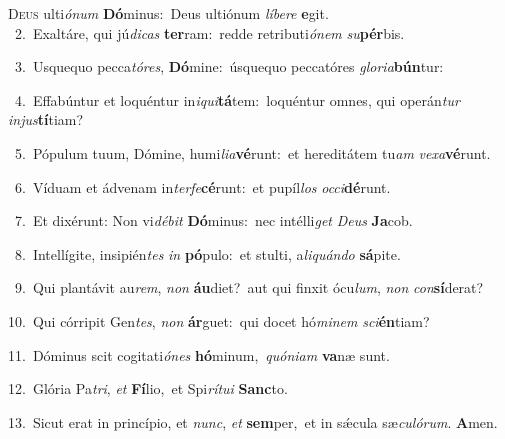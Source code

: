 \lettrine{\initial\textcolor{\initialcolor}{D}}{eus} ulti\-\textit{ó}\-\textit{num} \textbf{Dó}\-minus:~\star Deus ultiónum \textit{lí}\-\textit{be}\textit{re} \textbf{e}\-git.\\
{\numbfont\textcolor{\numbcolor}{~2.}}~Exaltáre, qui jú\-\textit{di}\-\textit{cas} \textbf{ter}\-ram:~\star redde retributi\-\textit{ó}\-\textit{nem} \textit{su}\-\textbf{pér}bis.\par
{\numbfont\textcolor{\numbcolor}{~3.}}~Usquequo pecca\-\textit{tó}\-\textit{res}, \textbf{Dó}\-mine:~\star úsquequo peccatóres \textit{glo}\-\textit{ri}\textit{a}\textbf{bún}tur:\par
{\numbfont\textcolor{\numbcolor}{~4.}}~Effabúntur et loquéntur in\-\textit{i}\-\textit{qui}\textbf{tá}tem:~\star loquéntur omnes, qui operán\textit{tur} \textit{in}\-\textit{jus}\textbf{tí}tiam?\par
{\numbfont\textcolor{\numbcolor}{~5.}}~Pópulum tuum, Dómine, humi\-\textit{li}\-\textit{a}\textbf{vé}runt:~\star et hereditátem tu\textit{am} \textit{ve}\-\textit{xa}\textbf{vé}runt.\par
{\numbfont\textcolor{\numbcolor}{~6.}}~Víduam et ádvenam in\-\textit{ter}\-\textit{fe}\textbf{cé}runt:~\star et pupíl\textit{los} \textit{oc}\-\textit{ci}\textbf{dé}runt.\par
{\numbfont\textcolor{\numbcolor}{~7.}}~Et dixérunt: Non vi\-\textit{dé}\-\textit{bit} \textbf{Dó}\-minus:~\star nec intélli\textit{get} \textit{De}\-\textit{us} \textbf{Ja}\-cob.\par
{\numbfont\textcolor{\numbcolor}{~8.}}~Intellígite, insipién\textit{tes} \textit{in} \textbf{pó}\-pulo:~\star et stulti, a\-\textit{li}\-\textit{quán}\textit{do} \textbf{sá}\-pite.\par
{\numbfont\textcolor{\numbcolor}{~9.}}~Qui plantávit au\-\textit{rem}\-, \textit{non} \textbf{áu}\-diet?~\star aut qui finxit ócu\-\textit{lum}\-, \textit{non} \textit{con}\-\textbf{sí}derat?\par
{\numbfont\textcolor{\numbcolor}{10.}}~Qui córripit Gen\-\textit{tes}\-, \textit{non} \textbf{ár}\-guet:~\star qui docet hó\-\textit{mi}\-\textit{nem} \textit{sci}\-\textbf{én}tiam?\par
{\numbfont\textcolor{\numbcolor}{11.}}~Dóminus scit cogitati\-\textit{ó}\-\textit{nes} \textbf{hó}\-minum,~\star \textit{quón}\-\textit{i}\textit{am} \textbf{va}\-næ sunt.\par
{\numbfont\textcolor{\numbcolor}{12.}}~Glória Pa\-\textit{tri}\-, \textit{et} \textbf{Fí}\-lio,~\star et Spi\-\textit{rí}\-\textit{tu}\textit{i} \textbf{Sanc}\-to.\par
{\numbfont\textcolor{\numbcolor}{13.}}~Sicut erat in princípio, et \textit{nunc}\-, \textit{et} \textbf{sem}\-per,~\star et in sǽcula sæ\-\textit{cu}\-\textit{ló}\textit{rum}. \textbf{A}\-men.\par
